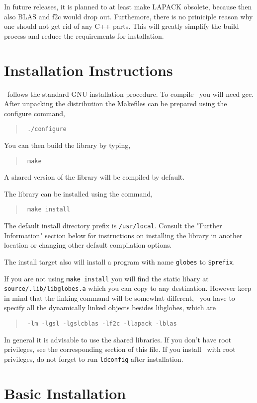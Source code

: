 \begin{appendix}
In future releases, it is planned to at least make LAPACK obsolete, because
then also BLAS and f2c would drop out. Furthemore, there is no priniciple
reason why one should not get rid of any C++ parts. 
This will greatly simplify
the build process and reduce the requirements for installation.

\section*{Installation Instructions}

\GLOBES\ follows the standard GNU installation procedure.  To compile \GLOBES\
you will need gcc.  After unpacking the distribution
the Makefiles can be prepared using the configure command,
\begin{quote}
{\tt
./configure
}
\end{quote}
You can then build the library by typing,
\begin{quote}
{\tt
make
}
\end{quote}
A shared  version of the library will be compiled by
default. 
 
The library can be installed using the command,
\begin{quote}
{\tt
make install
}
\end{quote}
The default install directory prefix is \verb+/usr/local+.  Consult the
"Further Information" section below for instructions on installing the
library in another location or changing other default compilation
options.

The install target also will install a program with name \verb+globes+ to
\verb+$prefix+.

If you are not using \verb+make install+ you will find the static libary
at \verb+source/.lib/libglobes.a+ which you can copy to any destination.
However keep in mind that the linking command will be somewhat different,
\ie\ you have to specify all the dynamically linked objects besides libglobes,
which are
\begin{quote}
{\tt
         -lm -lgsl -lgslcblas -lf2c -llapack -lblas
}
\end{quote}

In general it is advisable to use the shared libraries. If you don't
have root privileges, see the corresponding section of this file.
If you install \GLOBES\ with root privileges, do not forget to run 
{\tt ldconfig} after installation.
 
\section*{Basic Installation}


\end{appendix}

